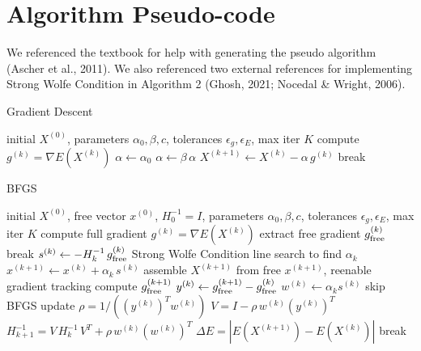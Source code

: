 \documentclass[11pt,onecolumn]{article}
\begin{document}
\section{Algorithm Pseudo-code}
We referenced the textbook for help with generating the pseudo algorithm (Ascher et al., 2011). We also referenced two external references for implementing Strong Wolfe Condition in Algorithm 2 (Ghosh, 2021; Nocedal \& Wright, 2006).
\begin{algorithm}[H]
\caption{Gradient Descent}
\begin{algorithmic}[1]
\Require initial $X^{(0)}$, parameters $\alpha_0, \beta, c$, tolerances $\epsilon_g, \epsilon_E$, max iter $K$
  \State compute $g^{(k)} = \nabla E(X^{(k)})$
  \State $\alpha \gets \alpha_0$
    \State $\alpha \gets \beta\,\alpha$
  \EndWhile
  \State $X^{(k+1)} \gets X^{(k)} - \alpha\,g^{(k)}$
    \State break 
  \EndIf
\EndFor
\end{algorithmic}
\end{algorithm}
\begin{algorithm}[H]
\caption{BFGS}
\begin{algorithmic}[1]
\Require initial $X^{(0)}$, free vector $x^{(0)}$, $H_0^{-1}=I$, parameters $\alpha_0, \beta, c$, tolerances $\epsilon_g, \epsilon_E$, max iter $K$
  \State compute full gradient $g^{(k)} = \nabla E(X^{(k)})$
  \State extract free gradient $g^{(k)}_{\rm free}$
    \State break 
  \EndIf
  \State $s^{(k)} \gets -H_k^{-1}\,g^{(k)}_{\rm free}$
  \State Strong Wolfe Condition line search to find $\alpha_k$
  \State $x^{(k+1)} \gets x^{(k)} + \alpha_k\,s^{(k)}$
  \State assemble $X^{(k+1)}$ from free $x^{(k+1)}$, reenable gradient tracking
  \State compute $g^{(k+1)}_{\rm free}$
  \State $y^{(k)} \gets g^{(k+1)}_{\rm free} - g^{(k)}_{\rm free}$
  \State $w^{(k)}\leftarrow \alpha_k s^{(k)}$
    \State skip BFGS update
  \Else
    \State $\rho = 1 / ((y^{(k)})^T w^{(k)})$
    \State $V = I - \rho\,w^{(k)}(y^{(k)})^T$
    \State $H_{k+1}^{-1} = V\,H_k^{-1}\,V^T + \rho\,w^{(k)}(w^{(k)})^T$
  \EndIf
  \State $\Delta E = |E(X^{(k+1)}) - E(X^{(k)})|$
    \State break 
  \EndIf
\EndFor
\end{algorithmic}
\end{algorithm}
\end{document}
